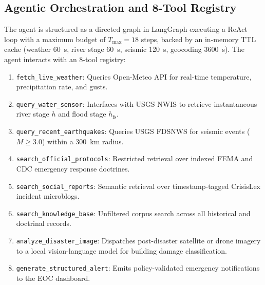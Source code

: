 \documentclass[conference]{IEEEtran}
\begin{document}
\subsection{Agentic Orchestration and 8-Tool Registry}
The agent is structured as a directed graph in LangGraph \cite{langgraph} executing a ReAct loop \cite{react} with a maximum budget of $T_{\max} = 18$ steps, backed by an in-memory TTL cache (weather 60~s, river stage 60~s, seismic 120~s, geocoding 3600~s). The agent interacts with an 8-tool registry:
\begin{enumerate}
    \item \texttt{fetch\_live\_weather}: Queries Open-Meteo API for real-time temperature, precipitation rate, and gusts.
    \item \texttt{query\_water\_sensor}: Interfaces with USGS NWIS to retrieve instantaneous river stage $h$ and flood stage $h_{\mathrm{fs}}$.
    \item \texttt{query\_recent\_earthquakes}: Queries USGS FDSNWS for seismic events ($M \ge 3.0$) within a 300~km radius.
    \item \texttt{search\_official\_protocols}: Restricted retrieval over indexed FEMA and CDC emergency response doctrines.
    \item \texttt{search\_social\_reports}: Semantic retrieval over timestamp-tagged CrisisLex incident microblogs.
    \item \texttt{search\_knowledge\_base}: Unfiltered corpus search across all historical and doctrinal records.
    \item \texttt{analyze\_disaster\_image}: Dispatches post-disaster satellite or drone imagery to a local vision-language model for building damage classification.
    \item \texttt{generate\_structured\_alert}: Emits policy-validated emergency notifications to the EOC dashboard.
\end{enumerate}
\end{document}
